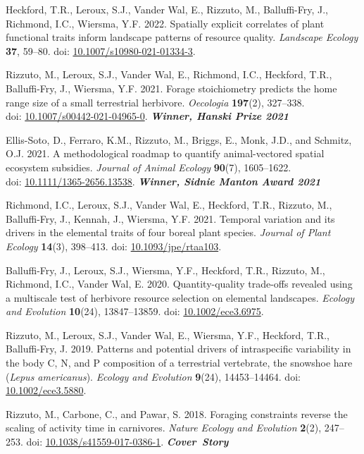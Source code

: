 \documentclass[11pt, letterpaper]{awesome-cv}
\begin{document}
\begin{etaremune}
  \item Heckford, T.R., Leroux, S.J., Vander Wal, E., \textcolor{awesome}{Rizzuto, M.}, Balluffi-Fry, J., Richmond, I.C., Wiersma, Y.F. 2022. Spatially explicit correlates of plant functional traits inform landscape patterns of resource quality. \emph{Landscape Ecology} \textbf{37}, 59--80. doi: \href{https://doi.org/10.1007/s10980-021-01334-3}{10.1007/s10980-021-01334-3}.
  \item \textcolor{awesome}{Rizzuto, M.}, Leroux, S.J., Vander Wal, E., Richmond, I.C., Heckford, T.R., Balluffi-Fry, J., Wiersma, Y.F. 2021. Forage stoichiometry predicts the home range size of a small terrestrial herbivore. \emph{Oecologia} \textbf{197}(2), 327--338.\\ doi: \href{https://rdcu.be/cSX31}{10.1007/s00442-021-04965-0}. \null\hfill\textbf{\textit{Winner, Hanski Prize 2021}}
  \item Ellis-Soto, D.\textsuperscript{\textdagger}, Ferraro, K.M.\textsuperscript{\textdagger}, \textcolor{awesome}{Rizzuto, M.}, Briggs, E., Monk, J.D., and Schmitz, O.J. 2021. A methodological roadmap to quantify animal-vectored spatial ecosystem subsidies. \emph{Journal of Animal Ecology} \textbf{90}(7), 1605--1622.\\ doi: \href{https://doi.org/10.1111/1365-2656.13538}{10.1111/1365-2656.13538}. \null\hfill\textbf{\textit{Winner, Sidnie Manton Award 2021}}
  \item Richmond, I.C., Leroux, S.J., Vander Wal, E., Heckford, T.R., \textcolor{awesome}{Rizzuto, M.}, Balluffi-Fry, J., Kennah, J., Wiersma, Y.F. 2021. Temporal variation and its drivers in the elemental traits of four boreal plant species. \emph{Journal of Plant Ecology} \textbf{14}(3), 398--413. doi: \href{https://doi.org/10.1093/jpe/rtaa103}{10.1093/jpe/rtaa103}.
  \item Balluffi-Fry, J., Leroux, S.J., Wiersma, Y.F., Heckford, T.R., \textcolor{awesome}{Rizzuto, M.}, Richmond, I.C., Vander Wal, E. 2020. Quantity-quality trade-offs revealed using a multiscale test of herbivore resource selection on elemental landscapes. \emph{Ecology and Evolution} \textbf{10}(24), 13847--13859. doi: \href{https://doi.org/10.1002/ece3.6975}{10.1002/ece3.6975}.
  \item \textcolor{awesome}{Rizzuto, M.}, Leroux, S.J., Vander Wal, E., Wiersma, Y.F., Heckford, T.R., Balluffi-Fry, J. 2019. Patterns and potential drivers of intraspecific variability in the body C, N, and P composition of a terrestrial vertebrate, the snowshoe hare (\textit{Lepus americanus}). \textit{Ecology and Evolution} \textbf{9}(24), 14453--14464. doi: \href{https://doi.org/10.1002/ece3.5880}{10.1002/ece3.5880}.
  \item \textcolor{awesome}{Rizzuto, M.}, Carbone, C., and Pawar, S. 2018. Foraging constraints reverse the scaling of activity time in carnivores. \emph{Nature Ecology and Evolution} \textbf{2}(2), 247--253. doi: \href{https://doi.org/10.1038/s41559-017-0386-1}{10.1038/s41559-017-0386-1}. \null\hfill\textbf{\textit{Cover~Story}}
\end{etaremune}


\end{document}
